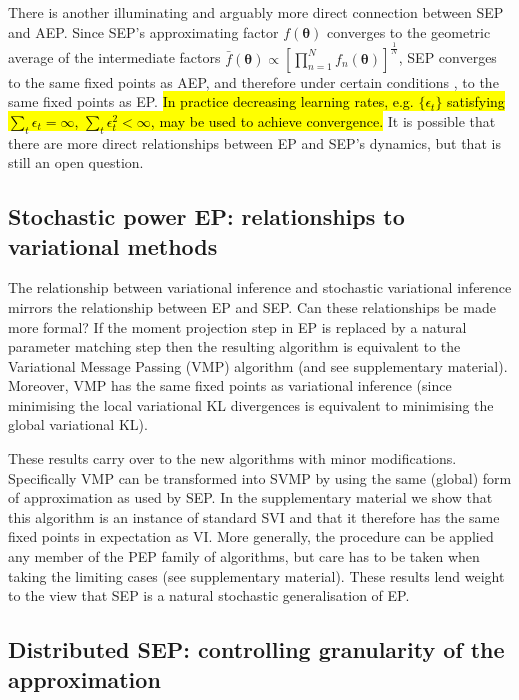 There is another illuminating and arguably more direct connection between SEP and AEP. Since SEP's approximating factor $f(\bm{\theta})$ converges to the geometric average of the intermediate factors $\bar{f}(\bm{\theta}) \propto [\prod_{n=1}^N f_n(\bm{\theta})]^{\frac{1}{N}}$, SEP converges to the same fixed points as AEP, and therefore under certain conditions \cite{barthelme:aep}, to the same fixed points as EP. \hl{In practice decreasing learning rates, e.g. $\{\epsilon_t\}$ satisfying $\sum_t \epsilon_t = \infty$, $\sum_t \epsilon_t^2 < \infty$, may be used to achieve convergence.}
%
It is possible that there are more direct relationships between EP and SEP's dynamics, but that is still an open question.



\subsection{Stochastic power EP: relationships to variational methods}
%
The relationship between variational inference and stochastic variational inference \cite{hoffman:svi} mirrors the relationship between EP and SEP. 
%
Can these relationships be made more formal? If the moment projection step in EP is replaced by a natural parameter matching step then the resulting algorithm is equivalent to the Variational Message Passing (VMP) algorithm \cite{minka:divergence} (and see supplementary material). Moreover, VMP has the same fixed points as variational inference \cite{winn:vmp} (since minimising the local variational KL divergences is equivalent to minimising the global variational KL). 


These results carry over to the new algorithms with minor modifications. Specifically VMP can be transformed into SVMP by using the same (global) form of approximation as used by SEP. In the supplementary material we show that this algorithm is an instance of standard SVI and that it therefore has the same fixed points in expectation as VI. 
%
More generally, the procedure can be applied any member of the PEP family of algorithms, but care has to be taken when taking the limiting cases (see supplementary material).
%
These results lend weight to the view that SEP is a natural stochastic generalisation of EP.


\subsection{Distributed SEP: controlling granularity of the approximation}

